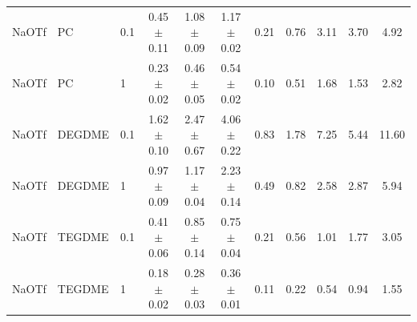\begin{table}[h]
{\begin{tabular}{lll ccc cc ccc}
NaOTf & PC & 0.1 & 0.45 $\pm$ 0.11 & 1.08 $\pm$ 0.09 & 1.17 $\pm$ 0.02 & 0.21 & 0.76 & 3.11 & 3.70 & 4.92 \\
NaOTf & PC & 1 & 0.23 $\pm$ 0.02 & 0.46 $\pm$ 0.05 & 0.54 $\pm$ 0.02 & 0.10 & 0.51 & 1.68 & 1.53 & 2.82 \\
NaOTf & DEGDME & 0.1 & 1.62 $\pm$ 0.10 & 2.47 $\pm$ 0.67 & 4.06 $\pm$ 0.22 & 0.83 & 1.78 & 7.25 & 5.44 & 11.60 \\
NaOTf & DEGDME & 1 & 0.97 $\pm$ 0.09 & 1.17 $\pm$ 0.04 & 2.23 $\pm$ 0.14 & 0.49 & 0.82 & 2.58 & 2.87 & 5.94 \\
NaOTf & TEGDME & 0.1 & 0.41 $\pm$ 0.06 & 0.85 $\pm$ 0.14 & 0.75 $\pm$ 0.04 & 0.21 & 0.56 & 1.01 & 1.77 & 3.05 \\
NaOTf & TEGDME & 1 & 0.18 $\pm$ 0.02 & 0.28 $\pm$ 0.03 & 0.36 $\pm$ 0.01 & 0.11 & 0.22 & 0.54 & 0.94 & 1.55 \\
\bottomrule
\end{tabular}%
}
\end{table}
